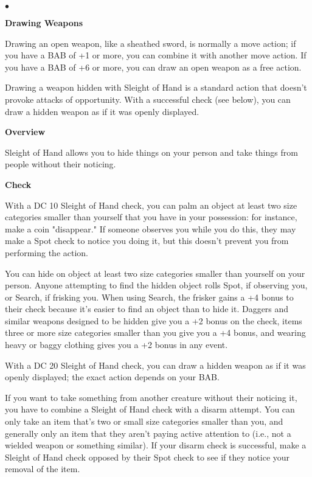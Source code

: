 \begin{list}{$\bullet$}{\itemspace}
	\item\textbf{Drawing Weapons}

	Drawing an open weapon, like a sheathed sword, is normally a move action; if you have a BAB of +1 or more, you can combine it with another move action. If you have a BAB of +6 or more, you can draw an open weapon as a free action.

	Drawing a weapon hidden with Sleight of Hand is a standard action that doesn't provoke attacks of opportunity. With a successful check (see below), you can draw a hidden weapon as if it was openly displayed.
	\item\textbf{Overview}

	Sleight of Hand allows you to hide things on your person and take things from people without their noticing.
	\item\textbf{Check}

	With a DC 10 Sleight of Hand check, you can palm an object at least two size categories smaller than yourself that you have in your possession: for instance, make a coin "disappear." If someone observes you while you do this, they may make a Spot check to notice you doing it, but this doesn't prevent you from performing the action.

	You can hide on object at least two size categories smaller than yourself on your person. Anyone attempting to find the hidden object rolls Spot, if observing you, or Search, if frisking you. When using Search, the frisker gains a +4 bonus to their check because it's easier to find an object than to hide it. Daggers and similar weapons designed to be hidden give you a +2 bonus on the check, items three or more size categories smaller than you give you a +4 bonus, and wearing heavy or baggy clothing gives you a +2 bonus in any event.

	With a DC 20 Sleight of Hand check, you can draw a hidden weapon as if it was openly displayed; the exact action depends on your BAB.

	If you want to take something from another creature without their noticing it, you have to combine a Sleight of Hand check with a disarm attempt. You can only take an item that's two or small size categories smaller than you, and generally only an item that they aren't paying active attention to (i.e., not a wielded weapon or something similar). If your disarm check is successful, make a Sleight of Hand check opposed by their Spot check to see if they notice your removal of the item.


\end{list}
